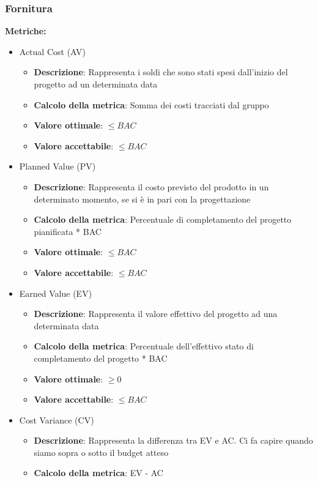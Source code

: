 \documentclass[12pt]{article}
\begin{document}
\subsubsection{Fornitura}
\textbf{Metriche:}
\begin{itemize}
	\item Actual Cost (AV)
	      \begin{itemize}
		      \item \textbf{Descrizione}: Rappresenta i soldi che sono stati spesi dall'inizio del progetto ad un determinata data
		      \item \textbf{Calcolo della metrica}: Somma dei costi tracciati dal gruppo
		      \item \textbf{Valore ottimale}: $\le BAC$
		      \item \textbf{Valore accettabile}: $\le BAC$
	      \end{itemize}
	\item Planned Value (PV)
	      \begin{itemize}
		      \item \textbf{Descrizione}: Rappresenta il costo previsto del prodotto in un determinato momento, se si è in pari con la progettazione
		      \item \textbf{Calcolo della metrica}: Percentuale di completamento del progetto pianificata * BAC
		      \item \textbf{Valore ottimale}: $\le BAC$
		      \item \textbf{Valore accettabile}: $\le BAC$
	      \end{itemize}
	\item Earned Value (EV)
	      \begin{itemize}
		      \item \textbf{Descrizione}: Rappresenta il valore effettivo del progetto ad una determinata data
		      \item \textbf{Calcolo della metrica}: Percentuale dell'effettivo stato di completamento del progetto * BAC
		      \item \textbf{Valore ottimale}: $\ge 0$
		      \item \textbf{Valore accettabile}: $\le BAC$
	      \end{itemize}
	\item Cost Variance (CV)
	      \begin{itemize}
		      \item \textbf{Descrizione}: Rappresenta la differenza tra EV e AC. Ci fa capire quando siamo sopra o sotto il budget atteso
		      \item \textbf{Calcolo della metrica}:  EV - AC

\end{itemize}
\end{itemize}
\end{document}
